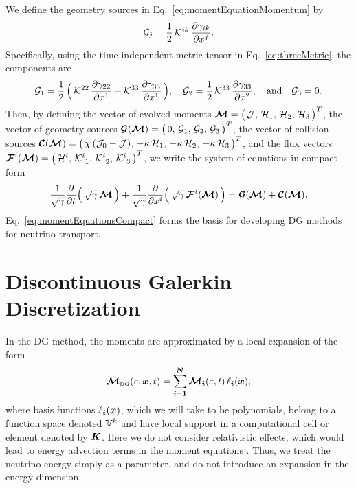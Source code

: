\documentclass[10pt,preprint]{aastex}
\begin{document}
We define the geometry sources in Eq.~\eqref{eq:momentEquationMomentum} by
\begin{equation}
  \mathcal{G}_{j}
  =\frac{1}{2}\,\mathcal{K}^{ik}\,\frac{\partial \gamma_{ik}}{\partial x^{j}}.  
\end{equation}
Specifically, using the time-independent metric tensor in Eq.~\eqref{eq:threeMetric}, the components are
\begin{equation}
  \mathcal{G}_{1}
  =\frac{1}{2}\,\Big(\,\mathcal{K}^{22}\,\frac{\partial \gamma_{22}}{\partial x^{1}}+\mathcal{K}^{33}\,\frac{\partial \gamma_{33}}{\partial x^{1}}\,\Big), \quad
  \mathcal{G}_{2}
  =\frac{1}{2}\,\mathcal{K}^{33}\,\frac{\partial \gamma_{33}}{\partial x^{2}}, \quad\text{and}\quad
  \mathcal{G}_{3}
  =0.
\end{equation}
Then, by defining the vector of evolved moments $\boldsymbol{\mathcal{M}}=\big(\,\mathcal{J},\,\mathcal{H}_{1},\,\mathcal{H}_{2},\,\mathcal{H}_{3}\,\big)^{T}$, the vector of geometry sources $\boldsymbol{\mathcal{G}}(\boldsymbol{\mathcal{M}})=\big(\,0,\,\mathcal{G}_{1},\,\mathcal{G}_{2},\,\mathcal{G}_{3}\,\big)^{T}$, the vector of collision sources $\boldsymbol{\mathcal{C}}(\boldsymbol{\mathcal{M}})=\big(\,\chi\,(\mathcal{J}_{0}-\mathcal{J}),\,-\kappa\,\mathcal{H}_{1},\,-\kappa\,\mathcal{H}_{2},\,-\kappa\,\mathcal{H}_{3}\,\big)^{T}$, and the flux vectors $\boldsymbol{\mathcal{F}}^{i}(\boldsymbol{\mathcal{M}})=\big(\,\mathcal{H}^{i},\,\mathcal{K}_{~1}^{i},\,\mathcal{K}_{~2}^{i},\,\mathcal{K}_{~3}^{i}\,\big)^{T}$, we write the system of equations in compact form
\begin{equation}
  \frac{1}{\sqrt{\gamma}}\frac{\partial }{\partial t}\Big(\,\sqrt{\gamma}\,\boldsymbol{\mathcal{M}}\,\Big)
  +\frac{1}{\sqrt{\gamma}}\frac{\partial }{\partial x^{i}}\Big(\,\sqrt{\gamma}\,\boldsymbol{\mathcal{F}}^{i}(\boldsymbol{\mathcal{M}})\,\Big)
  =\boldsymbol{\mathcal{G}}(\boldsymbol{\mathcal{M}})+\boldsymbol{\mathcal{C}}(\boldsymbol{\mathcal{M}}).
  \label{eq:momentEquationsCompact}
\end{equation}
Eq.~\eqref{eq:momentEquationsCompact} forms the basis for developing DG methods for neutrino transport.  

\clearpage

\section{Discontinuous Galerkin Discretization}

In the DG method, the moments are approximated by a local expansion of the form
\begin{equation}
  \boldsymbol{\mathcal{M}}_{\mbox{\tiny DG}}(\varepsilon,\boldsymbol{x},t)
  =\sum_{\boldsymbol{i}=\boldsymbol{1}}^{\boldsymbol{N}}\boldsymbol{\mathcal{M}}_{\boldsymbol{i}}(\varepsilon,t)\,\ell_{\boldsymbol{i}}(\boldsymbol{x}), 
\end{equation}
where basis functions $\ell_{\boldsymbol{i}}(\boldsymbol{x})$, which we will take to be polynomials, belong to a function space denoted $\mathbb{V}^{k}$ and have local support in a computational cell or element denoted by $\boldsymbol{K}$.  
Here we do not consider relativistic effects, which would lead to energy advection terms in the moment equations \citep[cf.][]{cardall_etal_2013a}.  
Thus, we treat the neutrino energy simply as a parameter, and do not introduce an expansion in the energy dimension.  
\end{document}
